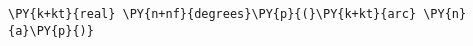\begin{Verbatim}[commandchars=\\\{\}]
    \PY{k+kt}{real} \PY{n+nf}{degrees}\PY{p}{(}\PY{k+kt}{arc} \PY{n}{a}\PY{p}{)}
\end{Verbatim}
